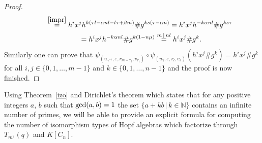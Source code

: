 \documentclass[pdftex]{sigma}
\numberwithin{equation}{section}
\begin{document}
\begin{proof}
\begin{gather*}
\qquad{} \stackrel{\eqref{impr}} {=} h^{i}x^{j} h^{k(\tau l - \alpha n l - l \tau + \beta m)} \# g^{ks(\tau - \alpha n)}
 = h^{i}x^{j} h^{-k \alpha n l } \# g^{ks\tau} \\
 \qquad \ {} = h^{i}x^{j} h^{-k \alpha n l } \# g^{k(1-n \mu)} \stackrel{m \,|\, nl} = h^{i}x^{j} \# g^{k}.
\end{gather*}
Similarly one can prove that $\psi_{(u_{\gamma^{-1}}, \varepsilon, r_{m-\tau_{2}}, v_{\tau_{1}})} \circ \psi_{(u_{\gamma}, \varepsilon, r_{l}, v_{s})} (h^{i}x^{j} \# g^{k}) = h^{i}x^{j} \# g^{k}$ for all $i, j \in \{0, 1,\dots, m-1\}$ and $k \in \{0, 1,\dots, n-1\}$ and the proof is now finished.
\end{proof}

Using Theorem~\ref{izo} and Dirichlet's theorem \cite[Theorem~7.9]{ap} which states that for any positive integers $a$, $b$ such that ${\rm gcd}(a, b) = 1$ the set $\{a+kb \,|\, k \in \mathbb{N}\}$ contains an infinite number of primes, we will be able to provide an explicit formula for computing the number of isomorphism types of Hopf algebras which factorize through $T_{m^{2}}(q)$ and $K[C_n]$.
\end{document}
